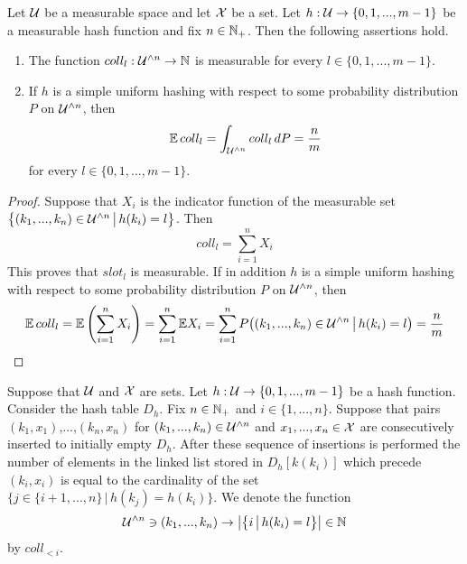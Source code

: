 \begin{theorem}\label{theorem:simple_uniform_hashing_expected_number_of_items_in_the_slot}
Let ${\mathcal U}$ be a measurable space and let ${\mathcal X}$ be a set. Let $h:{\mathcal U}\rightarrow \{0,1,...,m-1\}$ be a measurable hash function and fix $n\in {\mathbb N}_+$. Then the following assertions hold.
\begin{enumerate}[label=\emph{\textbf{(\arabic*)}}, leftmargin=*]
\item The function $coll_l:{\mathcal U}^{\wedge n}\rightarrow {\mathbb N}$ is measurable for every $l\in \{0,1,...,m-1\}$.
\item If $h$ is a simple uniform hashing with respect to some probability distribution $P$ on ${\mathcal U}^{\wedge n}$, then
$$\mathbb{E}\,coll_l = \int_{{\mathcal U}^{\wedge n}}coll_l\,dP = \frac{n}{m}$$
for every $l\in \{0,1,...,m-1\}$.
\end{enumerate}
\end{theorem}
\begin{proof}
Suppose that $X_i$ is the indicator function of the measurable set $\big\{(k_1,...,k_n)\in {\mathcal U}^{\wedge n}\,\big|\,h(k_i) = l\big\}$. Then
$$coll_l = \sum_{i=1}^nX_i$$
This proves that $slot_l$ is measurable. If in addition $h$ is a simple uniform hashing with respect to some probability distribution $P$ on ${\mathcal U}^{\wedge n}$, then
$$\mathbb{E}\,coll_l = \mathbb{E}\left(\sum_{i=1}^nX_i\right) = \sum_{i=1}^n\mathbb{E}X_i = \sum_{i=1}^nP\big((k_1,...,k_n)\in {\mathcal U}^{\wedge n}\,\big|\,h(k_i) = l\big) = \frac{n}{m}$$
\end{proof}
\noindent
Suppose that ${\mathcal U}$ and ${\mathcal X}$ are sets. Let $h:{\mathcal U}\rightarrow \{0,1,...,m-1\}$ be a hash function. Consider the hash table $D_h$. Fix $n\in {\mathbb N}_+$ and $i\in \{1,...,n\}$. Suppose that pairs $(k_1,x_1)$,...,$(k_n,x_n)$ for $(k_1,...,k_n)\in {\mathcal U}^{\wedge n}$ and $x_1,...,x_n\in {\mathcal X}$ are consecutively inserted to initially empty $D_h$. After these sequence of insertions is performed the number of elements in the linked list stored in $D_h[k(k_i)]$ which precede $(k_i,x_i)$ is equal to the cardinality of the set $\big\{j\in \{i+1,...,n\}\,\big|\,h(k_j) = h(k_i)\big\}$. We denote the function
$${\mathcal U}^{\wedge n}\ni (k_1,...,k_n)\rightarrow \big|\big\{i\,\big|\,h(k_i) = l\big\}\big|\in {\mathbb N}$$
by $coll_{< i}$.

